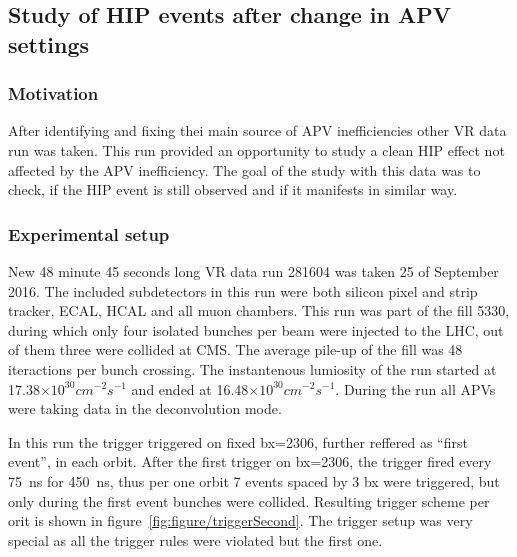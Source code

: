 \subsection{Study of HIP events after change in APV settings}

\subsubsection{Motivation}

After identifying and fixing thei main source of APV inefficiencies other VR data run was taken. This run provided an opportunity to study a clean HIP effect not affected by the APV inefficiency. The goal of the study with this data was to check, if the HIP event is still observed and if it manifests in similar way.


\subsubsection{Experimental setup}

New 48 minute 45 seconds long VR data run 281604 was taken 25 of September 2016. The included subdetectors in this run were both silicon pixel and strip tracker, ECAL, HCAL and all muon chambers. This run was part of the fill 5330, during which only four isolated bunches per beam were injected to the LHC, out of them three were collided at CMS. The average pile-up of the fill was 48 iteractions per bunch crossing. The instantenous lumiosity of the run started at 17.38$\times 10^{30} cm^{-2} s^{-1}$ and ended at 16.48$\times 10^{30} cm^{-2} s^{-1}$. During the run all APVs were taking data in the deconvolution mode. 

In this run the trigger triggered on fixed bx=2306, further reffered as ``first event'', in each orbit. After the first trigger on bx=2306, the trigger fired every 75~ns for 450~ns, thus per one orbit 7 events spaced by 3 bx were triggered, but only during the first event bunches were collided. Resulting trigger scheme per orit is shown in figure~\ref{fig:figure/triggerSecond}. The trigger setup was very special as  all the trigger rules were violated but the first one.

